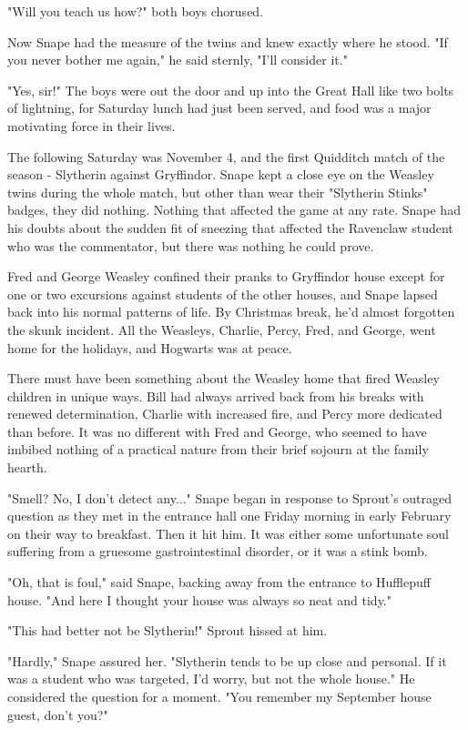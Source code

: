 "Will you teach us how?" both boys chorused.

Now Snape had the measure of the twins and knew exactly where he stood. "If you never bother me again," he said sternly, "I'll consider it."

"Yes, sir!" The boys were out the door and up into the Great Hall like two bolts of lightning, for Saturday lunch had just been served, and food was a major motivating force in their lives.

The following Saturday was November 4, and the first Quidditch match of the season - Slytherin against Gryffindor. Snape kept a close eye on the Weasley twins during the whole match, but other than wear their "Slytherin Stinks" badges, they did nothing. Nothing that affected the game at any rate. Snape had his doubts about the sudden fit of sneezing that affected the Ravenclaw student who was the commentator, but there was nothing he could prove.

Fred and George Weasley confined their pranks to Gryffindor house except for one or two excursions against students of the other houses, and Snape lapsed back into his normal patterns of life. By Christmas break, he'd almost forgotten the skunk incident. All the Weasleys, Charlie, Percy, Fred, and George, went home for the holidays, and Hogwarts was at peace.

There must have been something about the Weasley home that fired Weasley children in unique ways. Bill had always arrived back from his breaks with renewed determination, Charlie with increased fire, and Percy more dedicated than before. It was no different with Fred and George, who seemed to have imbibed nothing of a practical nature from their brief sojourn at the family hearth.

"Smell? No, I don't detect any..." Snape began in response to Sprout's outraged question as they met in the entrance hall one Friday morning in early February on their way to breakfast. Then it hit him. It was either some unfortunate soul suffering from a gruesome gastrointestinal disorder, or it was a stink bomb.

"Oh, that is foul," said Snape, backing away from the entrance to Hufflepuff house. "And here I thought your house was always so neat and tidy."

"This had better not be Slytherin!" Sprout hissed at him.

"Hardly," Snape assured her. "Slytherin tends to be up close and personal. If it was a student who was targeted, I'd worry, but not the whole house." He considered the question for a moment. "You remember my September house guest, don't you?"

